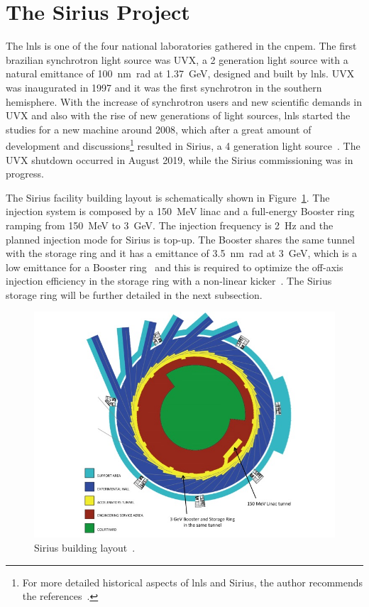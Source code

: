 \section{The Sirius Project}\label{sec:sirius_project}
The \gls{lnls} is one of the four national laboratories gathered in the \gls{cnpem}. The first brazilian synchrotron light source was UVX, a 2 generation light source with a natural emittance of \SI{100}{\nano\meter\radian} at \SI{1.37}{\giga\electronvolt}, designed and built by \gls{lnls}. UVX was inaugurated in 1997 and it was the first synchrotron in the southern hemisphere. With the increase of synchrotron users and new scientific demands in UVX and also with the rise of new generations of light sources, \gls{lnls} started the studies for a new machine around 2008, which after a great amount of development and discussions\footnote{For more detailed historical aspects of \gls{lnls} and Sirius, the author recommends the references~\cite{liu2019, aldo2019}.} resulted in Sirius, a 4 generation light source~\cite{liu2014}. The UVX shutdown occurred in August 2019, while the Sirius commissioning was in progress.

The Sirius facility building layout is schematically shown in Figure~\ref{fig:sirius_building}. The injection system is composed by a \SI{150}{\mega\electronvolt} \gls{linac} and a full-energy Booster ring ramping from \SI{150}{\mega\electronvolt} to \SI{3}{\giga\electronvolt}. The injection frequency is \SI{2}{\hertz} and the planned injection mode for Sirius is top-up. The Booster shares the same tunnel with the storage ring and it has a emittance of \SI{3.5}{\nano\meter\radian} at \SI{3}{\giga\electronvolt}, which is a low emittance for a Booster ring~\cite{sa2014a} and this is required to optimize the off-axis injection efficiency in the storage ring with a non-linear kicker~\cite{liu2016a}. The Sirius storage ring will be further detailed in the next subsection.
\begin{figure}
    \centering
    \includegraphics[scale=0.5]{figures/sirius_building.jpg}
    \caption{Sirius building layout~\cite{wiki}.}
    \label{fig:sirius_building}
\end{figure}
